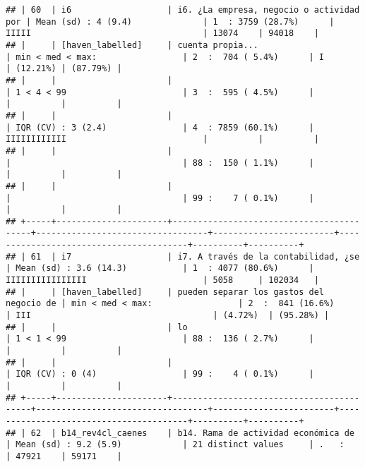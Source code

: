 \documentclass[]{article}
\begin{document}
\begin{verbatim}
## | 60  | i6                   | i6. ¿La empresa, negocio o actividad por | Mean (sd) : 4 (9.4)              | 1  : 3759 (28.7%)      | IIIII                                  | 13074    | 94018    |
## |     | [haven_labelled]     | cuenta propia...                         | min < med < max:                 | 2  :  704 ( 5.4%)      | I                                      | (12.21%) | (87.79%) |
## |     |                      |                                          | 1 < 4 < 99                       | 3  :  595 ( 4.5%)      |                                        |          |          |
## |     |                      |                                          | IQR (CV) : 3 (2.4)               | 4  : 7859 (60.1%)      | IIIIIIIIIIII                           |          |          |
## |     |                      |                                          |                                  | 88 :  150 ( 1.1%)      |                                        |          |          |
## |     |                      |                                          |                                  | 99 :    7 ( 0.1%)      |                                        |          |          |
## +-----+----------------------+------------------------------------------+----------------------------------+------------------------+----------------------------------------+----------+----------+
## | 61  | i7                   | i7. A través de la contabilidad, ¿se     | Mean (sd) : 3.6 (14.3)           | 1  : 4077 (80.6%)      | IIIIIIIIIIIIIIII                       | 5058     | 102034   |
## |     | [haven_labelled]     | pueden separar los gastos del negocio de | min < med < max:                 | 2  :  841 (16.6%)      | III                                    | (4.72%)  | (95.28%) |
## |     |                      | lo                                       | 1 < 1 < 99                       | 88 :  136 ( 2.7%)      |                                        |          |          |
## |     |                      |                                          | IQR (CV) : 0 (4)                 | 99 :    4 ( 0.1%)      |                                        |          |          |
## +-----+----------------------+------------------------------------------+----------------------------------+------------------------+----------------------------------------+----------+----------+
## | 62  | b14_rev4cl_caenes    | b14. Rama de actividad económica de      | Mean (sd) : 9.2 (5.9)            | 21 distinct values     | .   :                                  | 47921    | 59171    |

\end{verbatim}
\end{document}
